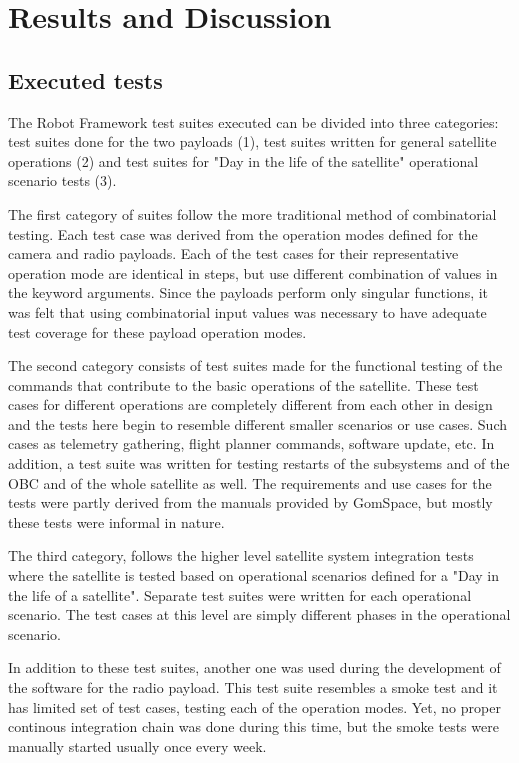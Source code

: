 \documentclass[english,12pt,a4paper,pdftex,elec,utf8]{aaltothesis}
\begin{document}
\section{Results and Discussion}
\subsection{Executed tests}
The Robot Framework test suites executed can be divided into three categories: test suites done for the two payloads (1), test suites written for general satellite operations (2) and test suites for "Day in the life of the satellite" operational scenario tests (3). \par 
The first category of suites follow the more traditional method of combinatorial testing. Each test case was derived from the operation modes defined for the camera and radio payloads. Each of the test cases for their representative operation mode are identical in steps, but use different combination of values in the keyword arguments. Since the payloads perform only singular functions, it was felt that using combinatorial input values was necessary to have adequate test coverage for these payload operation modes. \par
The second category consists of test suites made for the functional testing of the commands that contribute to the basic operations of the satellite. These test cases for different operations are completely different from each other in design and the tests here begin to resemble different smaller scenarios or use cases. Such cases as telemetry gathering, flight planner commands, software update, etc. In addition, a test suite was written for testing restarts of the subsystems and of the OBC and of the whole satellite as well. The requirements and use cases for the tests were partly derived from the manuals provided by GomSpace, but mostly these tests were informal in nature.\par 
The third category, follows the higher level satellite system integration tests where the satellite is tested based on operational scenarios defined for a "Day in the life of a satellite". Separate test suites were written for each operational scenario. The test cases at this level are simply different phases in the operational scenario.\par
In addition to these test suites, another one was used during the development of the software for the radio payload. This test suite resembles a smoke test and it has limited set of test cases, testing each of the operation modes. Yet, no proper continous integration chain was done during this time, but the smoke tests were manually started usually once every week.\par   
\end{document}
